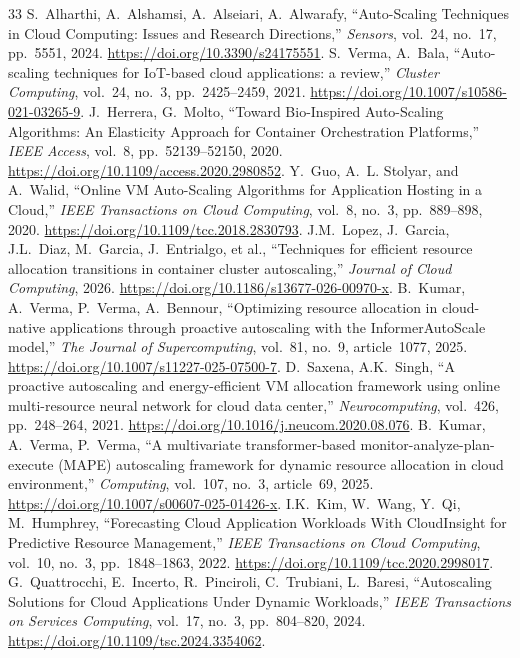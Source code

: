 \documentclass[10pt,twocolumn,a4paper]{article}
\begin{document}
\begin{thebibliography}{33}
 S.~Alharthi, A.~Alshamsi, A.~Alseiari, A.~Alwarafy, ``Auto-Scaling Techniques in Cloud Computing: Issues and Research Directions,'' \emph{Sensors}, vol.~24, no.~17, pp.~5551, 2024. \url{https://doi.org/10.3390/s24175551}.
 S.~Verma, A.~Bala, ``Auto-scaling techniques for IoT-based cloud applications: a review,'' \emph{Cluster Computing}, vol.~24, no.~3, pp.~2425--2459, 2021. \url{https://doi.org/10.1007/s10586-021-03265-9}.
 J.~Herrera, G.~Molto, ``Toward Bio-Inspired Auto-Scaling Algorithms: An Elasticity Approach for Container Orchestration Platforms,'' \emph{IEEE Access}, vol.~8, pp.~52139--52150, 2020. \url{https://doi.org/10.1109/access.2020.2980852}.
 Y.~Guo, A.~L. Stolyar, and A.~Walid, ``Online VM Auto-Scaling Algorithms for Application Hosting in a Cloud,'' \emph{IEEE Transactions on Cloud Computing}, vol.~8, no.~3, pp.~889--898, 2020. \url{https://doi.org/10.1109/tcc.2018.2830793}.
 J.M.~Lopez, J.~Garcia, J.L.~Diaz, M.~Garcia, J.~Entrialgo, et al., ``Techniques for efficient resource allocation transitions in container cluster autoscaling,'' \emph{Journal of Cloud Computing}, 2026. \url{https://doi.org/10.1186/s13677-026-00970-x}.
 B.~Kumar, A.~Verma, P.~Verma, A.~Bennour, ``Optimizing resource allocation in cloud-native applications through proactive autoscaling with the InformerAutoScale model,'' \emph{The Journal of Supercomputing}, vol.~81, no.~9, article~1077, 2025. \url{https://doi.org/10.1007/s11227-025-07500-7}.
 D.~Saxena, A.K.~Singh, ``A proactive autoscaling and energy-efficient VM allocation framework using online multi-resource neural network for cloud data center,'' \emph{Neurocomputing}, vol.~426, pp.~248--264, 2021. \url{https://doi.org/10.1016/j.neucom.2020.08.076}.
 B.~Kumar, A.~Verma, P.~Verma, ``A multivariate transformer-based monitor-analyze-plan-execute (MAPE) autoscaling framework for dynamic resource allocation in cloud environment,'' \emph{Computing}, vol.~107, no.~3, article~69, 2025. \url{https://doi.org/10.1007/s00607-025-01426-x}.
 I.K.~Kim, W.~Wang, Y.~Qi, M.~Humphrey, ``Forecasting Cloud Application Workloads With CloudInsight for Predictive Resource Management,'' \emph{IEEE Transactions on Cloud Computing}, vol.~10, no.~3, pp.~1848--1863, 2022. \url{https://doi.org/10.1109/tcc.2020.2998017}.
 G.~Quattrocchi, E.~Incerto, R.~Pinciroli, C.~Trubiani, L.~Baresi, ``Autoscaling Solutions for Cloud Applications Under Dynamic Workloads,'' \emph{IEEE Transactions on Services Computing}, vol.~17, no.~3, pp.~804--820, 2024. \url{https://doi.org/10.1109/tsc.2024.3354062}.

\end{thebibliography}
\end{document}
